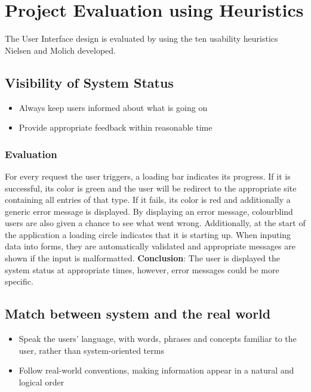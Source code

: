 \section{Project Evaluation using Heuristics}
The User Interface design is evaluated by using the ten usability heuristics Nielsen and Molich developed.

\subsection{Visibility of System Status}
\begin{itemize}
    \item Always keep users informed about what is going on
    \item Provide appropriate feedback within reasonable time
\end{itemize}

\subsubsection{Evaluation}
For every request the user triggers, a loading bar indicates its progress. If it is successful, its color is green and the user will be redirect to the appropriate site containing all entries of that type. If it fails, its color is red and additionally a generic error message is displayed. By displaying an error message, colourblind users are also given a chance to see what went wrong. Additionally, at the start of the application a loading circle indicates that it is starting up. When inputing data into forms, they are automatically validated and appropriate messages are shown if the input is malformatted. \textbf{Conclusion}: The user is displayed the system status at appropriate times, however, error messages could be more specific.

\subsection{Match between system and the real world }

\begin{itemize}
    \item Speak the users' language, with words, phrases and concepts familiar to the user, rather than system-oriented terms
    \item Follow real-world conventions, making information appear in a natural and logical order
\end{itemize}

